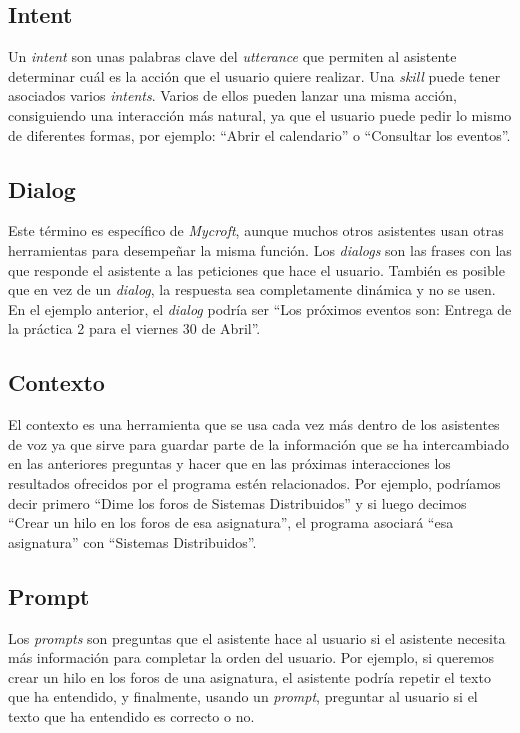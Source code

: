 \subsection{Intent}
Un \textit{intent} \cite{mycroftglossary} son unas palabras clave del \textit{utterance} que permiten al asistente determinar cuál es la acción que el usuario quiere realizar. Una \textit{skill} puede tener asociados varios \textit{intents}. Varios de ellos pueden lanzar una misma acción, consiguiendo una interacción más natural, ya que el usuario puede pedir lo mismo de diferentes formas, por ejemplo: ``Abrir el calendario'' o ``Consultar los eventos''.

\subsection{Dialog}
Este término es específico de \textit{Mycroft}, aunque muchos otros asistentes usan otras herramientas para desempeñar la misma función. Los \textit{dialogs} son las frases con las que responde el asistente a las peticiones que hace el usuario. También es posible que en vez de un \textit{dialog}, la respuesta sea completamente dinámica y no se usen. En el ejemplo anterior, el \textit{dialog} podría ser ``Los próximos eventos son: Entrega de la práctica 2 para el viernes 30 de Abril''.

\subsection{Contexto}
El contexto es una herramienta que se usa cada vez más dentro de los asistentes de voz ya que sirve para guardar parte de la información que se ha intercambiado en las anteriores preguntas y hacer que en las próximas interacciones los resultados ofrecidos por el programa estén relacionados. Por ejemplo, podríamos decir primero ``Dime los foros de Sistemas Distribuidos'' y si luego decimos ``Crear un hilo en los foros de esa asignatura'', el programa asociará ``esa asignatura'' con ``Sistemas Distribuidos''.

\subsection{Prompt}
Los \textit{prompts} son preguntas que el asistente hace al usuario si el asistente necesita más información para completar la orden del usuario. Por ejemplo, si queremos crear un hilo en los foros de una asignatura, el asistente podría repetir el texto que ha entendido, y finalmente, usando un \textit{prompt}, preguntar al usuario si el texto que ha entendido es correcto o no.

